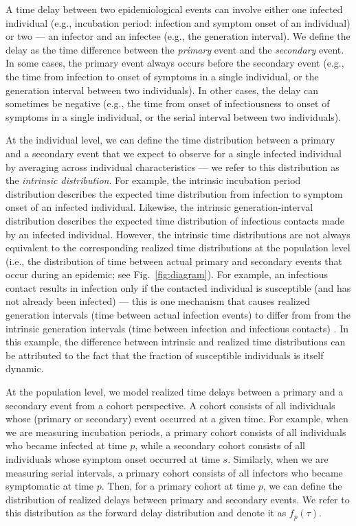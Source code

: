 \documentclass[12pt]{article}
\newcommand{\fref}[1]{Fig.~\ref{fig:#1}}
\newcommand{\psymp}{\ensuremath{p}} %
\newcommand{\ssymp}{\ensuremath{s}} %
\begin{document}
A time delay between two epidemiological events can involve either one infected individual (e.g., incubation period: infection and symptom onset of an individual) or two --- an infector and an infectee (e.g., the generation interval).
We define the delay as the time difference between the \emph{primary} event and the \emph{secondary} event.
In some cases, the primary event always occurs before the secondary event (e.g., the time from infection to onset of symptoms in a single individual, or the generation interval between two individuals). 
In other cases, the delay can sometimes be negative (e.g., the time from onset of infectiousness to onset of symptoms in a single individual, or the serial interval between two individuals).

At the individual level, we can define the time distribution between a primary and a secondary event that we expect to observe for a single infected individual by averaging across individual characteristics --- we refer to this distribution as the \emph{intrinsic distribution}.
For example, the intrinsic incubation period distribution describes the expected time distribution from infection to symptom onset of an infected individual.
Likewise, the intrinsic generation-interval distribution describes the expected time distribution of infectious contacts made by an infected individual.
However, the intrinsic time distributions are not always equivalent to the corresponding realized time distributions at the population level (i.e., the distribution of time between actual primary and secondary events that occur during an epidemic; see \fref{diagram}).
For example, an infectious contact results in infection only if the contacted individual is susceptible (and has not already been infected) ---
this is one mechanism that causes realized generation intervals (time between actual infection events) to differ from from the intrinsic generation intervals (time between infection and infectious contacts) \citep{park2020inferring}.
In this example, the difference between intrinsic and realized time distributions can be attributed to the fact that the fraction of susceptible individuals is itself dynamic.

At the population level, we model realized time delays between a primary and a secondary event from a cohort perspective.
A cohort consists of all individuals whose (primary or secondary) event occurred at a given time.
For example, when we are measuring incubation periods, a primary cohort consists of all individuals who became infected at time \psymp, while a secondary cohort consists of all individuals whose symptom onset occurred at time \ssymp.
Similarly, when we are measuring serial intervals, a primary cohort consists of all infectors who became symptomatic at time \psymp.
Then, for a primary cohort at time \psymp, we can define the distribution of realized delays between primary and secondary events. 
We refer to this distribution as the forward delay distribution and denote it as $f_\psymp(\tau)$.
\end{document}
